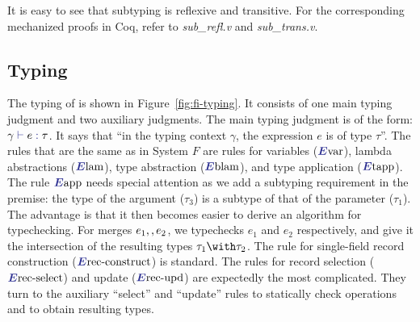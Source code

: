 


It is easy to see that subtyping is reflexive and transitive. For the
corresponding mechanized proofs in Coq, refer to \textit{sub\_refl.v} and
\textit{sub\_trans.v}.

\subsection{Typing}

\begin{figure*}
  
  \caption{The type system of \name.}
  \label{fig:fi-typing}
\end{figure*}

The typing of \name is shown in Figure~\ref{fig:fi-typing}. It consists of one
main typing judgment and two auxiliary judgments. The main typing judgment is of
the form: $ \judgee \gamma e \tau $. It says that ``in the typing context
$\gamma$, the expression $e$ is of type $\tau$''. The rules that are the same as
in System $F$ are rules for variables ($\rulelabelevar$), lambda abstractions
($\rulelabelelam$), type abstraction ($\rulelabeleblam$), and type application
($\rulelabeletapp$). The rule $\rulelabeleapp$ needs special attention as we add
a subtyping requirement in the premise: the type of the argument ($\tau_3$) is a
subtype of that of the parameter ($\tau_1$). The advantage is that it then
becomes easier to derive an algorithm for typechecking. For merges
$e_1 ,, e_2$, we typechecks $e_1$ and $e_2$ respectively, and give it the
intersection of the resulting types $\tau_1 \andop \tau_2$. The rule for
single-field record construction ($\rulelabelereccon$) is standard. The rules
for record selection ($\rulelabelerecselect$) and update ($\rulelabelerecupd$) are
expectedly the most complicated. They turn to the auxiliary ``select'' and ``update''
rules to statically check operations and to obtain resulting types.

